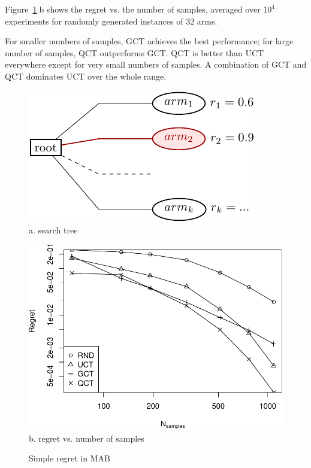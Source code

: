 \documentclass{article}
\begin{document}
Figure~\ref{fig:mab-simple-regret}.b shows the regret
vs. the number of samples, averaged
over $10^4$ experiments for randomly generated instances of 32 arms. 

For smaller numbers of samples, GCT achieves the best
performance; for large number of samples, QCT outperforms GCT. QCT is
better than UCT everywhere except for very small numbers of samples. A
combination of GCT and QCT dominates UCT over the whole range.

\begin{figure}[t]
  \begin{minipage}[c]{0.5\linewidth}
    \centering
    \includegraphics[scale=1.0]{onelevel-tree.pdf}\\
    \vspace{4em}
    a. search tree
  \end{minipage}
  \begin{minipage}[c]{0.5\linewidth}
    \centering
    \includegraphics[scale=0.5]{flat-trilevel-k=64-uqb=8.pdf}\\
    b. regret vs. number of samples
  \end{minipage}
  \label{fig:mab-simple-regret}
  \caption{Simple regret in MAB}
\end{figure}
\end{document}
